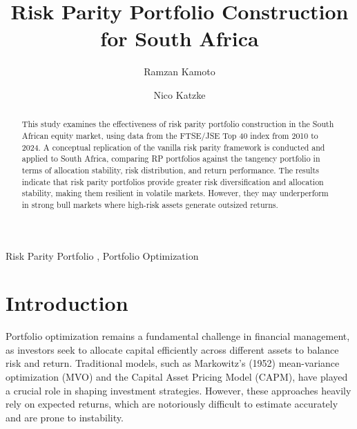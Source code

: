 \documentclass[preprint, 3p,
authoryear]{elsarticle} %
\begin{document}
\begin{frontmatter}

  \title{Risk Parity Portfolio Construction for South Africa}
    \author[Stellenbosch University]{Ramzan Kamoto%
  }
    \author[Stellenbosch University]{Nico Katzke%
  }
  
  \begin{abstract}
  This study examines the effectiveness of risk parity portfolio
  construction in the South African equity market, using data from the
  FTSE/JSE Top 40 index from 2010 to 2024. A conceptual replication of
  the vanilla risk parity framework is conducted and applied to South
  Africa, comparing RP portfolios against the tangency portfolio in
  terms of allocation stability, risk distribution, and return
  performance. The results indicate that risk parity portfolios provide
  greater risk diversification and allocation stability, making them
  resilient in volatile markets. However, they may underperform in
  strong bull markets where high-risk assets generate outsized returns.
  \end{abstract}
    \begin{keyword}
    Risk Parity Portfolio \sep 
    Portfolio Optimization
  \end{keyword}
  
 \end{frontmatter}

\hypertarget{introduction}{%
\section{Introduction}\label{introduction}}

Portfolio optimization remains a fundamental challenge in financial
management, as investors seek to allocate capital efficiently across
different assets to balance risk and return. Traditional models, such as
Markowitz's (1952) mean-variance optimization (MVO) and the Capital
Asset Pricing Model (CAPM), have played a crucial role in shaping
investment strategies. However, these approaches heavily rely on
expected returns, which are notoriously difficult to estimate accurately
and are prone to instability.
\end{document}
